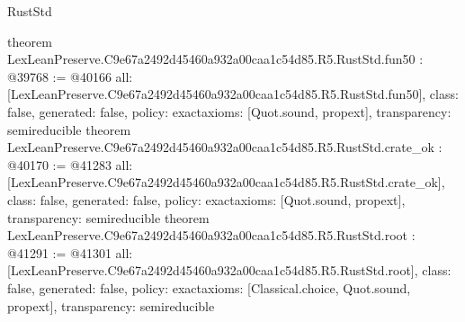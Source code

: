 \begin{lexlean}{RustStd}
\begin{coremodule}
{}
theorem LexLeanPreserve.C9e67a2492d45460a932a00caa1c54d85.R5.RustStd.fun50 : @39768 := @40166 {
  all: [LexLeanPreserve.C9e67a2492d45460a932a00caa1c54d85.R5.RustStd.fun50],
  class: false,
  generated: false,
  policy: exact{axioms: [Quot.sound, propext]},
  transparency: semireducible
}
theorem LexLeanPreserve.C9e67a2492d45460a932a00caa1c54d85.R5.RustStd.crate_ok : @40170 := @41283 {
  all: [LexLeanPreserve.C9e67a2492d45460a932a00caa1c54d85.R5.RustStd.crate_ok],
  class: false,
  generated: false,
  policy: exact{axioms: [Quot.sound, propext]},
  transparency: semireducible
}
theorem LexLeanPreserve.C9e67a2492d45460a932a00caa1c54d85.R5.RustStd.root : @41291 := @41301 {
  all: [LexLeanPreserve.C9e67a2492d45460a932a00caa1c54d85.R5.RustStd.root],
  class: false,
  generated: false,
  policy: exact{axioms: [Classical.choice, Quot.sound, propext]},
  transparency: semireducible
}


\end{coremodule}
\end{lexlean}
